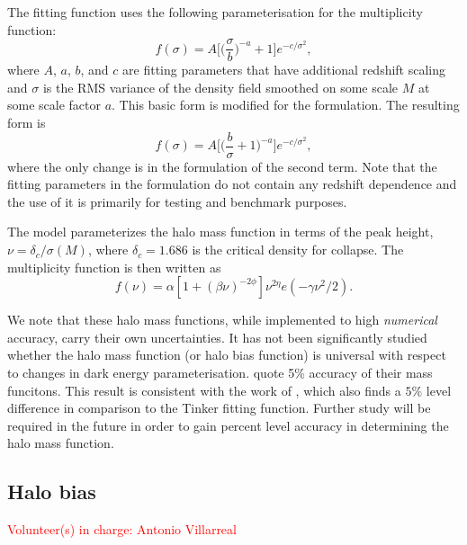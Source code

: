 \documentclass[\docopts]{\docclass}
\newcommand{\vol}[1]{\textcolor{red}{Volunteer(s) in charge: #1}}
\begin{document}
The \citet{Tinker2008} fitting function uses the following parameterisation for the multiplicity function:
\begin{equation}
f(\sigma)=A\Big[\Big(\frac{\sigma}{b}\Big)^{-a}+1\Big]e^{-c/{\sigma}^2},
\end{equation}
where $A$, $a$, $b$, and $c$ are fitting parameters that have additional redshift scaling and $\sigma$ is the RMS variance of the density field smoothed on some scale $M$ at some scale factor $a$. This basic form is modified for the \citet{Angulo2012} formulation. The resulting form is
\begin{equation}
f(\sigma)=A\Big[\Big(\frac{b}{\sigma}+1\Big)^{-a}\Big]e^{-c/{\sigma}^2},
\end{equation}
where the only change is in the formulation of the second term. Note that the fitting parameters in the \citet{Angulo2012} formulation do not contain any redshift dependence and the use of it is primarily for testing and benchmark purposes.

The \citet{Tinker2010} model parameterizes the halo mass function in terms of the peak height, $\nu = \delta_c/\sigma(M)$, where $\delta_c=1.686$ is the critical density for collapse. The multiplicity function is then written as
\begin{equation}
  f(\nu) = \alpha[1+(\beta\nu)^{-2\phi}]\nu^{2\eta}e(-\gamma\nu^2/2).
\end{equation}

We note that these halo mass functions, while implemented to high {\em numerical} accuracy, carry their own uncertainties. It has not been significantly studied whether the halo mass function (or halo bias function) is universal with respect to changes in dark energy parameterisation.
\citet{Tinker2008,Tinker2010} quote 5\% accuracy of their mass funcitons.
This result is consistent with the work of \citet{Watson2013}, which also finds a $5\%$ level difference in comparison to the Tinker fitting function. Further study will be required in the future in order to gain percent level accuracy in determining the halo mass function.

\subsection{Halo bias}
\vol{Antonio Villarreal}
\end{document}
